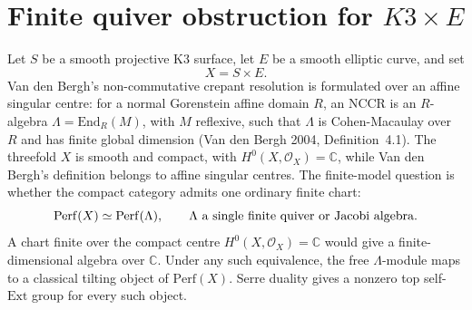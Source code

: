 
\providecommand{\NCCR}{\mathrm{NCCR}}
\providecommand{\End}{\mathrm{End}}
\providecommand{\Hom}{\mathrm{Hom}}
\providecommand{\Ext}{\mathrm{Ext}}
\providecommand{\RHom}{\mathbf{R}\!\operatorname{Hom}}
\providecommand{\Coh}{\mathrm{Coh}}
\providecommand{\Db}{D^b}
\providecommand{\cO}{\mathcal{O}}
\providecommand{\cE}{\mathcal{E}}
\providecommand{\cP}{\mathcal{P}}
\providecommand{\cM}{\mathcal{M}}
\providecommand{\Perf}{\mathrm{Perf}}
\providecommand{\Spec}{\mathrm{Spec}}
\providecommand{\Jac}{\operatorname{Jac}}
\providecommand{\CoHA}{\operatorname{CoHA}}
\providecommand{\kcat}{\kappa_{\mathrm{cat}}}
\providecommand{\kch}{\kappa_{\mathrm{ch}}}
\providecommand{\kBKM}{\kappa_{\mathrm{BKM}}}
\providecommand{\kfib}{\kappa_{\mathrm{fiber}}}
\providecommand{\kHeis}{\kappa_{\mathrm{ch}}^{\mathrm{Heis}}}
\providecommand{\SerreS}{\mathbb{S}}
\providecommand{\DT}{\mathrm{DT}}

\section*{Finite quiver obstruction for $K3\times E$}
\label{sec:K3E-NCCR}

Let \(S\) be a smooth projective K3 surface, let \(E\) be a smooth
elliptic curve, and set
\[
  X=S\times E .
\]
Van den Bergh's non-commutative crepant resolution is formulated over
an affine singular centre: for a normal Gorenstein affine domain
\(R\), an \(\NCCR\) is an \(R\)-algebra
\(\Lambda=\End_R(M)\), with \(M\) reflexive, such that \(\Lambda\) is
Cohen-Macaulay over \(R\) and has finite global dimension
(Van den Bergh 2004, Definition~4.1).  The threefold \(X\) is smooth
and compact, with \(H^0(X,\cO_X)=\mathbb C\), while Van den Bergh's
definition belongs to affine singular centres.  The finite-model
question is whether the compact category admits one ordinary finite
chart:
\[
  \Perf(X)\simeq \Perf(\Lambda),
  \qquad
  \Lambda \hbox{ a single finite quiver or Jacobi algebra.}
\]
A chart finite over the compact centre \(H^0(X,\cO_X)=\mathbb C\)
would give a finite-dimensional algebra over \(\mathbb C\).  Under any
such equivalence, the free \(\Lambda\)-module maps to a classical
tilting object of \(\Perf(X)\).  Serre duality gives a nonzero top
self-\(\Ext\) group for every such object.


